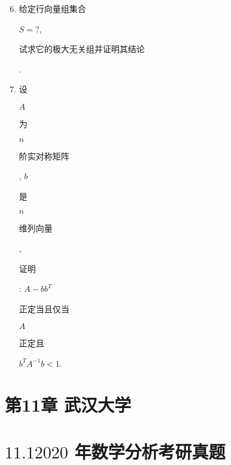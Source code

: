 \documentclass[10pt]{article}
\begin{document}
\begin{enumerate}
  \setcounter{enumi}{5}
  \item \begin{CJK}{UTF8}{mj}给定行向量组集合\end{CJK} $S=?$, \begin{CJK}{UTF8}{mj}试求它的极大无关组并证明其结论\end{CJK}.

  \item \begin{CJK}{UTF8}{mj}设\end{CJK} $A$ \begin{CJK}{UTF8}{mj}为\end{CJK} $n$ \begin{CJK}{UTF8}{mj}阶实对称矩阵\end{CJK}, $b$ \begin{CJK}{UTF8}{mj}是\end{CJK} $n$ \begin{CJK}{UTF8}{mj}维列向量\end{CJK}, \begin{CJK}{UTF8}{mj}证明\end{CJK}: $A-b b^{T}$ \begin{CJK}{UTF8}{mj}正定当且仅当\end{CJK} $A$ \begin{CJK}{UTF8}{mj}正定且\end{CJK} $b^{T} A^{-1} b<1$.

\end{enumerate}
\section{第11章 武汉大学}
\section{$11.12020$ 年数学分析考研真题}
\end{document}
